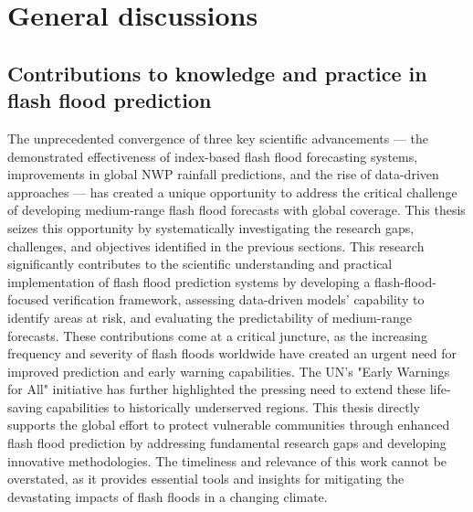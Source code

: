 \chapter{General discussions}
\label{general_discussions}
\graphicspath{{chapter_08/figures}{chapter_08/tables}}



\section{Contributions to knowledge and practice in flash flood prediction}


The unprecedented convergence of three key scientific advancements — the demonstrated effectiveness of index-based flash flood forecasting systems, improvements in global NWP rainfall predictions, and the rise of data-driven approaches — has created a unique opportunity to address the critical challenge of developing medium-range flash flood forecasts with global coverage. This thesis seizes this opportunity by systematically investigating the research gaps, challenges, and objectives identified in the previous sections. This research significantly contributes to the scientific understanding and practical implementation of flash flood prediction systems by developing a flash-flood-focused verification framework, assessing data-driven models' capability to identify areas at risk, and evaluating the predictability of medium-range forecasts. These contributions come at a critical juncture, as the increasing frequency and severity of flash floods worldwide have created an urgent need for improved prediction and early warning capabilities. The UN's "Early Warnings for All" initiative has further highlighted the pressing need to extend these life-saving capabilities to historically underserved regions. This thesis directly supports the global effort to protect vulnerable communities through enhanced flash flood prediction by addressing fundamental research gaps and developing innovative methodologies. The timeliness and relevance of this work cannot be overstated, as it provides essential tools and insights for mitigating the devastating impacts of flash floods in a changing climate.

